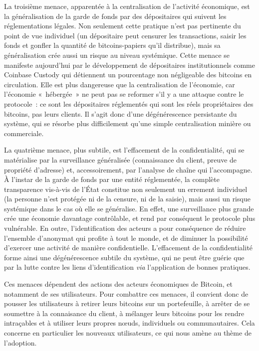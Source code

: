 La troisième menace, apparentée à la centralisation de l'activité économique, est la généralisation de la garde de fonds par des dépositaires qui suivent les réglementations légales. Non seulement cette pratique n'est pas pertinente du point de vue individuel (un dépositaire peut censurer les transactions, saisir les fonds et gonfler la quantité de bitcoins-papiers qu'il distribue), mais sa généralisation crée aussi un risque au niveau systémique. Cette menace se manifeste aujourd'hui par le développement de dépositaires institutionnels comme Coinbase Custody qui détiennent un pourcentage non négligeable des bitcoins en circulation. Elle est plus dangereuse que la centralisation de l'économie, car l'économie «~hébergée~» ne peut pas se reformer s'il y a une attaque contre le protocole~: ce sont les dépositaires réglementés qui sont les réels propriétaires des bitcoins, pas leurs clients. Il s'agit donc d'une dégénérescence persistante du système, qui se résorbe plus difficilement qu'une simple centralisation minière ou commerciale.

La quatrième menace, plus subtile, est l'effacement de la confidentialité, qui se matérialise par la surveillance généralisée (connaissance du client, preuve de propriété d'adresse) et, accessoirement, par l'analyse de chaîne qui l'accompagne. À l'instar de la garde de fonds par une entité réglementée, la complète transparence vis-à-vis de l'État constitue non seulement un errement individuel (la personne n'est protégée ni de la censure, ni de la saisie), mais aussi un risque systémique dans le cas où elle se généralise. En effet, une surveillance plus grande crée une économie davantage contrôlable, et rend par conséquent le protocole plus vulnérable. En outre, l'identification des acteurs a pour conséquence de réduire l'ensemble d'anonymat qui profite à tout le monde, et de diminuer la possibilité d'exercer une activité de manière confidentielle. L'effacement de la confidentialité forme ainsi une dégénérescence subtile du système, qui ne peut être guérie que par la lutte contre les liens d'identification \emph{via} l'application de bonnes pratiques. %

Ces menaces dépendent des actions des acteurs économiques de Bitcoin, et notamment de ses utilisateurs. Pour combattre ces menaces, il convient donc de pousser les utilisateurs à retirer leurs bitcoins sur un portefeuille, à arrêter de se soumettre à la connaisance du client, à mélanger leurs bitcoins pour les rendre intraçables et à utiliser leurs propres nœuds, individuels ou communautaires. Cela concerne en particulier les nouveaux utilisateurs, ce qui nous amène au thème de l'adoption.

